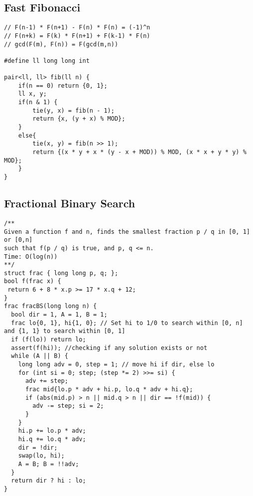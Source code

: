 \documentclass[FSZ,a4paper,onesided]{article}
\begin{document}
\begin{multicols*}{\COLS}
\subsection{Fast Fibonacci}
\begin{lstlisting}
// F(n-1) * F(n+1) - F(n) * F(n) = (-1)^n
// F(n+k) = F(k) * F(n+1) + F(k-1) * F(n)
// gcd(F(m), F(n)) = F(gcd(m,n))

#define ll long long int

pair<ll, ll> fib(ll n) {
    if(n == 0) return {0, 1};
    ll x, y;
    if(n & 1) {
        tie(y, x) = fib(n - 1);
        return {x, (y + x) % MOD};
    }
    else{
        tie(x, y) = fib(n >> 1);
        return {(x * y + x * (y - x + MOD)) % MOD, (x * x + y * y) % MOD};
    }
}
\end{lstlisting}
\subsection{Fractional Binary Search}
\begin{lstlisting}
/**
Given a function f and n, finds the smallest fraction p / q in [0, 1] or [0,n]
such that f(p / q) is true, and p, q <= n.
Time: O(log(n))
**/
struct frac { long long p, q; };
bool f(frac x) {
 return 6 + 8 * x.p >= 17 * x.q + 12;
}
frac fracBS(long long n) {
  bool dir = 1, A = 1, B = 1;
  frac lo{0, 1}, hi{1, 0}; // Set hi to 1/0 to search within [0, n] and {1, 1} to search within [0, 1]
  if (f(lo)) return lo;
  assert(f(hi)); //checking if any solution exists or not
  while (A || B) {
    long long adv = 0, step = 1; // move hi if dir, else lo
    for (int si = 0; step; (step *= 2) >>= si) {
      adv += step;
      frac mid{lo.p * adv + hi.p, lo.q * adv + hi.q};
      if (abs(mid.p) > n || mid.q > n || dir == !f(mid)) {
        adv -= step; si = 2;
      } 
    }
    hi.p += lo.p * adv;
    hi.q += lo.q * adv;
    dir = !dir;
    swap(lo, hi);
    A = B; B = !!adv;
  }
  return dir ? hi : lo;
}
\end{lstlisting}

\end{multicols*}
\end{document}
